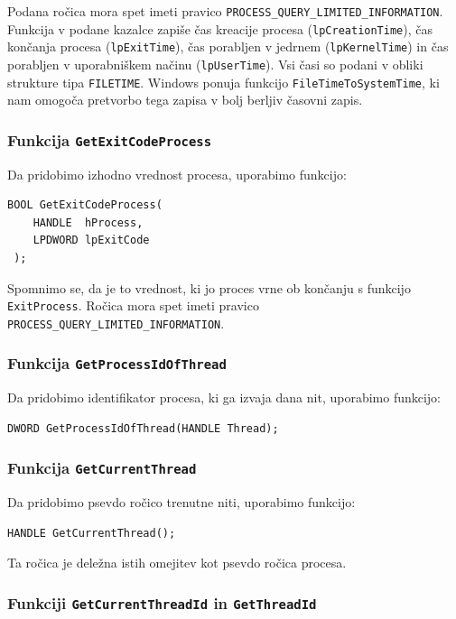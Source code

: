 \documentclass[a4paper,12pt,openright]{book}
\begin{document}
Podana ročica mora spet imeti pravico \texttt{PROCESS\_QUERY\_LIMITED\-\_INFOR\-MATION}.
Funkcija v podane kazalce zapiše čas kreacije procesa (\texttt{lpCreation\-Time}), čas končanja procesa (\texttt{lpExitTime}), čas porabljen v jedrnem (\texttt{lpKer\-nelTime}) in čas porabljen v uporabniškem načinu (\texttt{lpUserTime}).
Vsi časi so podani v obliki strukture tipa \texttt{FILETIME}.
Windows ponuja funkcijo \texttt{FileTime\-ToSystemTime}, ki nam omogoča pretvorbo tega zapisa v bolj berljiv časovni zapis.

\subsubsection{Funkcija \texttt{GetExitCodeProcess}}

Da pridobimo izhodno vrednost procesa, uporabimo funkcijo:
\begin{lstlisting}[style=func]
 BOOL GetExitCodeProcess(
	HANDLE  hProcess,
	LPDWORD lpExitCode
 );
\end{lstlisting}

Spomnimo se, da je to vrednost, ki jo proces vrne ob končanju s funkcijo \texttt{ExitProcess}.
Ročica mora spet imeti pravico \texttt{PROCESS\_QUERY\_LIMITED\-\_INFORMATION}.

\subsubsection{Funkcija \texttt{GetProcessIdOfThread}}

Da pridobimo identifikator procesa, ki ga izvaja dana nit, uporabimo funkcijo:
\begin{lstlisting}[style=func]
 DWORD GetProcessIdOfThread(HANDLE Thread);
\end{lstlisting}

\subsubsection{Funkcija \texttt{GetCurrentThread}}

Da pridobimo psevdo ročico trenutne niti, uporabimo funkcijo:
\begin{lstlisting}[style=func]
 HANDLE GetCurrentThread();
\end{lstlisting}
Ta ročica je deležna istih omejitev kot psevdo ročica procesa.

\subsubsection{Funkciji \texttt{GetCurrentThreadId} in \texttt{GetThreadId}}
\end{document}
